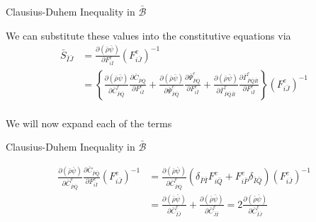 \documentclass[11pt]{beamer}
\begin{document}
\begin{frame}{Clausius-Duhem Inequality in $\bar{\mathcal{B}}$}

We can substitute these values into the constitutive equations via
\begin{align*}
\bar{S}_{\bar{I}\bar{J}} &= \frac{\partial\left(\bar{\rho}\bar{\psi}\right)}{\partial F_{i\bar{I}}^e} \left(F_{i\bar{J}}^e\right)^{-1}\\
&= \left\{\frac{\partial\left(\bar{\rho}\bar{\psi}\right)}{\partial \bar{C}_{\bar{P}\bar{Q}}^e}\frac{\partial \bar{C}_{\bar{P}\bar{Q}}}{\partial F_{i\bar{I}}^e}  + \frac{\partial\left(\bar{\rho}\bar{\psi}\right)}{\partial \bar{\Psi}_{\bar{P}\bar{Q}}^e} \frac{\partial \bar{\Psi}_{\bar{P}\bar{Q}}^e}{\partial F_{i\bar{I}}^e} + \frac{\partial\left(\bar{\rho}\bar{\psi}\right)}{\partial \bar{\Gamma}_{\bar{P}\bar{Q}\bar{R}}^e} \frac{\partial \bar{\Gamma}_{\bar{P}\bar{Q}\bar{R}}^e}{\partial F_{i\bar{I}}^e}\right\}\left(F_{i\bar{J}}^e\right)^{-1}\\
\end{align*}

We will now expand each of the terms

\end{frame}

\begin{frame}{Clausius-Duhem Inequality in $\bar{\mathcal{B}}$}

\begin{align*}
\frac{\partial\left(\bar{\rho}\bar{\psi}\right)}{\partial \bar{C}_{\bar{P}\bar{Q}}^e}\frac{\partial \bar{C}_{\bar{P}\bar{Q}}}{\partial F_{i\bar{I}}^e}\left(F_{i\bar{J}}^e\right)^{-1} &=\frac{\partial\left(\bar{\rho}\bar{\psi}\right)}{\partial \bar{C}_{\bar{P}\bar{Q}}^e} \left( \delta_{\bar{P}\bar{I}} F_{i\bar{Q}}^e + F_{i\bar{P}}^e \delta_{\bar{I}\bar{Q}}\right)\left(F_{i\bar{J}}^e\right)^{-1}\\
&= \frac{\partial\left(\bar{\rho}\bar{\psi}\right)}{\partial \bar{C}_{\bar{I}\bar{J}}^e} + \frac{\partial\left(\bar{\rho}\bar{\psi}\right)}{\partial \bar{C}_{\bar{J}\bar{I}}^e} = 2\frac{\partial\left(\bar{\rho}\bar{\psi}\right)}{\partial \bar{C}_{\bar{I}\bar{J}}^e}\\
\end{align*}
\end{frame}
\end{document}
